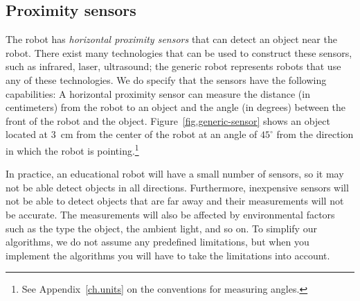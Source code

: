 \subsection{Proximity sensors}

The robot has \emph{horizontal proximity sensors} that can detect an object near the robot. There exist many technologies that can be used to construct these sensors, such as infrared, laser, ultrasound; the generic robot represents robots that use any of these technologies. We do specify that the sensors have the following capabilities: A horizontal proximity sensor can measure the distance (in centimeters) from the robot to an object and the angle (in degrees) between the front of the robot and the object. Figure~\ref{fig.generic-sensor} shows an object located at $3\,$ cm from the center of the robot at an angle of $45^{\circ}$ from the direction in which the robot is pointing.\footnote{See Appendix~\ref{ch.units} on the conventions for measuring angles.}

\begin{figure}
\subfigures
{}
\hspace{\fill}
\label{fig.generic-ground}
\end{figure}

In practice, an educational robot will have a small number of sensors, so it may not be able detect objects in all directions. Furthermore, inexpensive sensors will not be able to detect objects that are far away and their measurements will not be accurate. The measurements will also be affected by environmental factors such as the type the object, the ambient light, and so on. To simplify our algorithms, we do not assume any predefined limitations, but when you implement the algorithms you will have to take the limitations into account.

